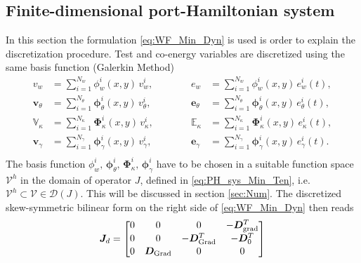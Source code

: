 \documentclass[preprint,12pt]{elsarticle}
\newcommand{\RevTwo}[1]{\textcolor{red!80!black}{#1}}
\begin{document}
\subsection{Finite-dimensional port-Hamiltonian system}
\label{sec:FD_system}
\RevTwo{
In this section the formulation \eqref{eq:WF_Min_Dyn} is used is order to explain the discretization procedure. Test and co-energy variables are discretized using the same basis function (Galerkin Method)
\begin{equation}
\begin{aligned}
v_w &= \sum_{i = 1}^{N_w} \phi_w^i(x,y) \, v_w^i, \\
\bm{v}_\theta &= \sum_{i = 1}^{N_\theta} \bm\phi_\theta^i(x,y) \, v_\theta^i, \\
\mathbb{V}_\kappa &= \sum_{i = 1}^{N_\kappa} \bm\Phi_\kappa^i(x,y) \, v_\kappa^i,\\
\bm{v}_{\gamma} &= \sum_{i = 1}^{N_{\gamma}} \bm\phi_{\gamma}^i(x,y) \, v_{\gamma}^i,\\
\end{aligned} \qquad \quad
\begin{aligned}
e_w &= \sum_{i = 1}^{N_w} \phi_w^i(x,y) \, e_w^i(t),  \\
\bm{e}_\theta &= \sum_{i = 1}^{N_\theta} \bm\phi_\theta^i(x,y) \, e_\theta^i(t), \\
\mathbb{E}_\kappa &= \sum_{i = 1}^{N_\kappa} \bm\Phi_\kappa^i(x,y) \, e_\kappa^i(t),\\
\bm{e}_{\gamma} &= \sum_{i = 1}^{N_{\gamma}} \bm\phi_{\gamma}^i(x,y) \, e_{\gamma}^i(t).\\
\end{aligned} 
\end{equation}
The basis function $\phi_w^i, \, \bm\phi_\theta^i, \, \bm\Phi_\kappa^i, \, \bm\phi_{\gamma}^i$ have to be chosen in a suitable function space $\mathcal{V}^h$ in the domain of operator $J$, defined in \eqref{eq:PH_sys_Min_Ten}, i.e. $\mathcal{V}^h \subset \mathcal{V} \in \mathcal{D}(J)$. This will be discussed in section \ref{sec:Num}. The discretized skew-symmetric bilinear form on the right side of \eqref{eq:WF_Min_Dyn} then reads
\begin{equation}
\bm{J}_d = 
\begin{bmatrix}
0 & 0 & 0 & -\bm{D}_{\mathrm{grad}}^T      \vspace{.3mm}\\ 
0 & 0 & -\bm{D}_{\mathrm{Grad}}^T & -\bm{D}_0^T \vspace{.3mm}\\
0 & \bm{D}_{\mathrm{Grad}} & 0 & 0         \vspace{.3mm}\\

\end{bmatrix}
\end{equation}}
\end{document}
